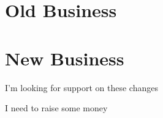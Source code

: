 \documentclass[11pt]{meetingmins}
\begin{document}
\section{Old Business}
\begin{items}
\item
\priormins
\end{items}

\section{New Business}
\begin{items}
\item
I'm looking for support on these changes
\item
I need to raise some money
\end{items}

\vspace{1em}
\end{document}

